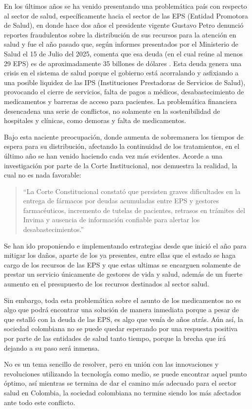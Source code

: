 En los últimos años se ha venido presentando una problemática país con respecto al sector de salud, específicamente hacia el sector de las EPS (Entidad Promotora de Salud), en donde hace dos años el presidente vigente Gustavo Petro denunció reportes fraudulentos sobre la distribución de sus recursos para la atención en salud y fue el año pasado que, según informes presentados por el Ministerio de Salud el 15 de Julio del 2025, comenta que esa deuda (en el cual reúne al menos 29 EPS) es de aproximadamente 35 billones de dólares \cite{minsalud2025}. Esta deuda genera una crisis en el sistema de salud porque el gobierno está acorralando y asfixiando a una posible liquidez de las IPS (Instituciones Prestadoras de Servicios de Salud), provocando el cierre de servicios, falta de pagos a médicos, desabastecimiento de medicamentos y barreras de acceso para pacientes. La problemática financiera desencadena una serie de conflictos, no solamente en la sostenibilidad de hospitales y clínicas, como demoras y falta de medicamentos.

Bajo esta naciente preocupación, donde aumenta de sobremanera los tiempos de espera para su distribución, afectando la continuidad de los tratamientos, en el último año se han venido haciendo cada vez más evidentes. Acorde a una investigación por parte de la Corte Institucional, nos demuestra la realidad, la cual no es nada favorable:

\begin{quote}
	``La Corte Constitucional constató que persisten graves dificultades en la entrega de fármacos por deudas acumuladas entre EPS y gestores farmacéuticos, incremento de tutelas de pacientes, retrasos en trámites del Invima y ausencia de información confiable para alertar los desabastecimientos.'' \cite{colprensa2025}
\end{quote}

Se han ido proponiendo e implementando estrategias desde que inició el año para mitigar los daños, aparte de los ya presentes, entre ellas que el estado se haga cargo de los recursos de las EPS y que estas ultimas se encarguen solamente de prestar un servicio únicamente de gestores de vida y salud, además de un fuerte aumento en el presupuesto de los recursos destinados al sector salud.

Sin embargo, toda esta problemática sobre el asunto de los medicamentos no es algo que podrá encontrar una solución de manera inmediata porque a pesar de que estalló con la deuda de las EPS, es algo que venía de años atrás. Aún así, la sociedad colombiana no se puede quedar esperando por una respuesta positiva por parte de las entidades de salud tanto tiempo, porque la brecha que irá dejando a su paso será inmensa.

No es un tema sencillo de resolver, pero en unión con las innovaciones y revoluciones utilizando la tecnología como medio, se puede encontrar aquel punto óptimo, así mientras se termina de dar el camino más adecuado para el sector salud en Colombia, la sociedad colombiana no termine siendo los más afectados ante todo este conflicto.

\pagebreak